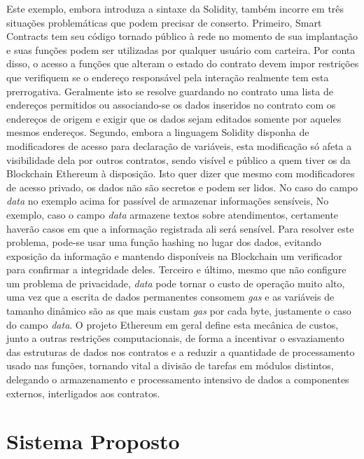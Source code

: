 \documentclass[a4paper,11pt]{article}
\begin{document}
Este exemplo, embora introduza a sintaxe da Solidity, também incorre em três situações problemáticas que podem precisar de conserto.
Primeiro, Smart Contracts tem seu código tornado público à rede no momento de sua implantação e suas funções podem ser utilizadas por qualquer usuário com carteira.
Por conta disso, o acesso a funções que alteram o estado do contrato devem impor restrições que verifiquem se o endereço responsável pela interação realmente tem esta prerrogativa.
Geralmente isto se resolve guardando no contrato uma lista de endereços permitidos ou associando-se os dados inseridos no contrato com os endereços de origem e exigir que os dados sejam editados somente por aqueles mesmos endereços.
Segundo, embora a linguagem Solidity disponha de modificadores de acesso para declaração de variáveis, esta modificação só afeta a visibilidade dela por outros contratos, sendo visível e público a quem tiver os da Blockchain Ethereum à disposição.
Isto quer dizer que mesmo com modificadores de acesso privado, os dados não são secretos e podem ser lidos.
No caso do campo \emph{data} no exemplo acima for passível de armazenar informações sensíveis,
No exemplo, caso o campo \emph{data} armazene textos sobre atendimentos, certamente haverão casos em que a informação registrada ali será sensível.
Para resolver este problema, pode-se usar uma função hashing no lugar dos dados, evitando exposição da informação e mantendo disponíveis na Blockchain um verificador para confirmar a integridade deles.
Terceiro e último, mesmo que não configure um problema de privacidade, \emph{data} pode tornar o custo de operação muito alto, uma vez que a escrita de dados permanentes consomem \emph{gas} e as variáveis de tamanho dinâmico são as que mais custam \emph{gas} por cada byte, justamente o caso do campo \emph{data}.
O projeto Ethereum em geral define esta mecânica de custos, junto a outras restrições computacionais, de forma a incentivar o esvaziamento das estruturas de dados nos contratos e a reduzir a quantidade de processamento usado nas funções, tornando vital a divisão de tarefas em módulos distintos, delegando o armazenamento e processamento intensivo de dados a componentes externos, interligados aos contratos.

\newpage
\section{Sistema Proposto}
\label{sec:sistema-proposto}
\end{document}
